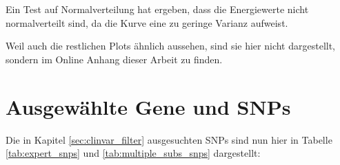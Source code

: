 Ein Test auf Normalverteilung  hat ergeben, dass die Energiewerte nicht normalverteilt sind, da die Kurve eine zu geringe Varianz aufweist. 

Weil auch die restlichen Plots ähnlich aussehen, sind sie hier nicht dargestellt, sondern im Online Anhang dieser Arbeit zu finden.



\section{Ausgewählte Gene und SNPs}
Die in Kapitel \ref{sec:clinvar_filter} ausgesuchten \ac{SNP}s sind nun hier in Tabelle \ref{tab:expert_snps} und \ref{tab:multiple_subs_snps} dargestellt:

\begin{table}[H]
    \centering
    \caption{Tabelle aller Gene des \emph{expert panels} mit mindestens 10 pathogenen \ac{SNP}s. Die verwendeten Gene sind grün markiert.}
    \label{tab:expert_snps}
\end{table}

